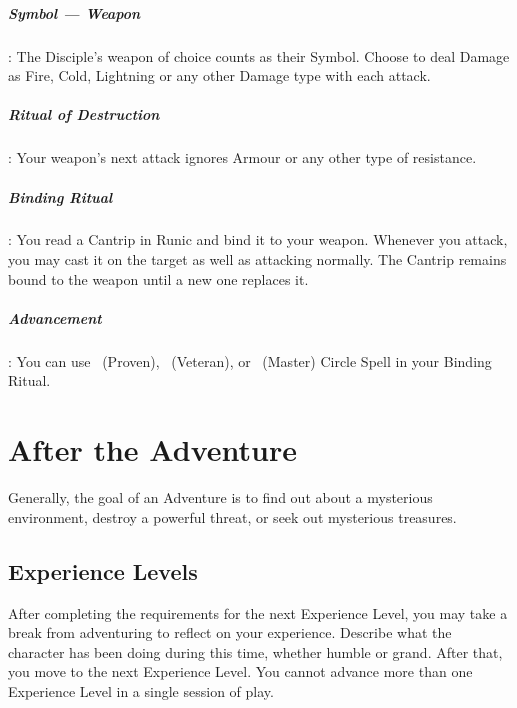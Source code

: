 \documentclass[itdr]{subfiles}
\begin{document}
\subparagraph{Symbol --- Weapon}: The Disciple's weapon of choice counts as their Symbol. Choose to deal Damage as Fire, Cold, Lightning or any other Damage type with each attack.

\subparagraph{Ritual of Destruction}: Your weapon's next attack ignores Armour or any other type of resistance.

\subparagraph{Binding Ritual}: You read a Cantrip in Runic and bind it to your weapon. Whenever you attack, you may cast it on the target as well as attacking normally. The Cantrip remains bound to the weapon until a new one replaces it.

\subparagraph{Advancement}: You can use ~(Proven), ~(Veteran), or ~(Master) Circle Spell in your Binding Ritual.

\vfill


\begin{comment}

\creed{???}
{\em\begin{itemize}
\item ???
\item ???
\end{itemize}}

\subparagraph{Symbol --- ???}:

\subparagraph{??? Ritual}:

\subparagraph{??? Ritual}:

\subparagraph{Advancement}:

\end{comment}

\break

\section{After the Adventure}

Generally, the goal of an Adventure is to find out about a mysterious environment, destroy a powerful threat, or seek out mysterious treasures.

\subsection{Experience Levels}
After completing the requirements for the next Experience Level, you may take a break from adventuring to reflect on your experience. Describe what the character has been doing during this time, whether humble or grand. After that, you move to the next Experience Level. You cannot advance more than one Experience Level in a single session of play.
\end{document}
